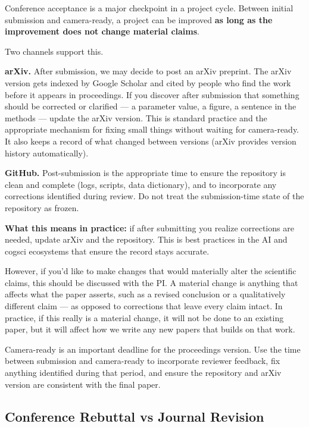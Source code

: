 \documentclass[11pt, letterpaper]{article}
\begin{document}
Conference acceptance is a major checkpoint in a project cycle. Between initial submission and camera-ready, a project can be improved \textbf{as long as the improvement does not change material claims}. 

Two channels support this.
 
\textbf{arXiv.} After submission, we may decide to post an arXiv preprint. The arXiv
version gets indexed by Google Scholar and cited by people who find the
work before it appears in proceedings. If you discover after submission that
something should be corrected or clarified --- a parameter value, a figure, a
sentence in the methods --- update the arXiv version. This is standard practice
and the appropriate mechanism for fixing small things without waiting for
camera-ready. It also keeps a record of what changed between versions (arXiv
provides version history automatically).
 
\textbf{GitHub.} Post-submission is the appropriate time to ensure the repository is clean and complete (logs, scripts, data dictionary), and to incorporate any corrections identified during
review. Do not treat the submission-time state of the repository as frozen.
 
\textbf{What this means in practice:} if after submitting you realize corrections are needed, update arXiv and the repository. This is best practices in the AI and cogsci ecosystems that ensure the record stays accurate.

However, if you'd like to make changes that would materially alter the scientific claims, this should be discussed with the PI. A material change is anything that affects what the paper asserts, such as a revised conclusion or a qualitatively different claim --- as opposed to corrections that leave every claim intact. In practice, if this really is a material change, it will not be done to an existing paper, but it will affect how we write any new papers that builds on that work.

Camera-ready is an important deadline for the proceedings version. Use the
time between submission and camera-ready to incorporate reviewer feedback, fix
anything identified during that period, and ensure the repository and arXiv
version are consistent with the final paper.

\subsection{Conference Rebuttal vs Journal Revision} 
\end{document}
